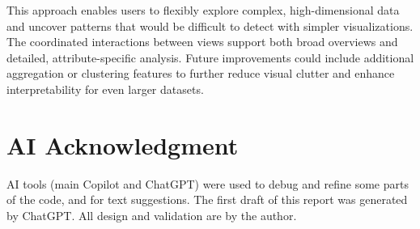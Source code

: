\documentclass[10pt,a4paper]{article}
\begin{document}
This approach enables users to flexibly explore complex, high-dimensional data and uncover patterns that would be difficult to detect with simpler visualizations. The coordinated interactions between views support both broad overviews and detailed, attribute-specific analysis. Future improvements could include additional aggregation or clustering features to further reduce visual clutter and enhance interpretability for even larger datasets.

\section{AI Acknowledgment}
AI tools (main Copilot and ChatGPT) were used to debug and refine some parts of the code, and for text suggestions. The first draft of this report was generated by ChatGPT. All design and validation are by the author.
\end{document}
